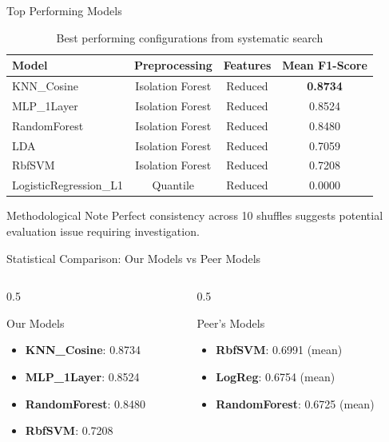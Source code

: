 \documentclass[10pt]{beamer}
\begin{document}
{\begin{frame}{Top Performing Models}
\begin{table}
\centering
\scriptsize
\begin{tabular}{lccc}
\toprule
\textbf{Model} & \textbf{Preprocessing} & \textbf{Features} & \textbf{Mean F1-Score} \\
\midrule
\textcolor{primary}{KNN\_Cosine} & Isolation Forest & Reduced & \textbf{0.8734} \\
\textcolor{primary}{MLP\_1Layer} & Isolation Forest & Reduced & 0.8524 \\
\textcolor{primary}{RandomForest} & Isolation Forest & Reduced & 0.8480 \\
LDA & Isolation Forest & Reduced & 0.7059 \\
RbfSVM & Isolation Forest & Reduced & 0.7208 \\
LogisticRegression\_L1 & Quantile & Reduced & 0.0000 \\
\bottomrule
\end{tabular}
\caption{Best performing configurations from systematic search}
\end{table}

\begin{alertblock}{Methodological Note}
Perfect consistency across 10 shuffles suggests potential evaluation issue requiring investigation.
\end{alertblock}
\end{frame}

\begin{frame}{Statistical Comparison: Our Models vs Peer Models}
\begin{columns}
\begin{column}{0.5\textwidth}
\begin{block}{Our Models}
\begin{itemize}
\item \textbf{KNN\_Cosine}: 0.8734
\item \textbf{MLP\_1Layer}: 0.8524  
\item \textbf{RandomForest}: 0.8480
\item \textbf{RbfSVM}: 0.7208
\end{itemize}
\end{block}
\end{column}
\begin{column}{0.5\textwidth}
\begin{block}{Peer's Models}
\begin{itemize}
\item \textbf{RbfSVM}: 0.6991 (mean)
\item \textbf{LogReg}: 0.6754 (mean)
\item \textbf{RandomForest}: 0.6725 (mean)
\end{itemize}
\end{block}
\end{column}
\end{columns}


\end{frame}}
\end{document}
